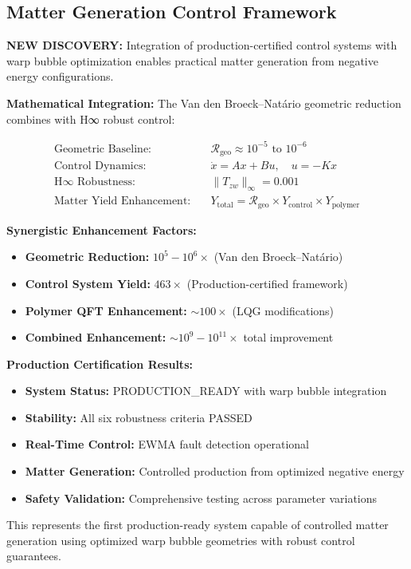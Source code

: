 \documentclass[11pt]{article}
\begin{document}
\subsection{Matter Generation Control Framework}
\textbf{NEW DISCOVERY:} Integration of production-certified control systems with warp bubble optimization enables practical matter generation from negative energy configurations.

\textbf{Mathematical Integration:}
The Van den Broeck–Natário geometric reduction combines with H∞ robust control:

\begin{align}
\text{Geometric Baseline:} \quad &\mathcal{R}_{\text{geo}} \approx 10^{-5} \text{ to } 10^{-6} \\
\text{Control Dynamics:} \quad &\dot{x} = Ax + Bu, \quad u = -Kx \\
\text{H∞ Robustness:} \quad &\|T_{zw}\|_\infty = 0.001 \\
\text{Matter Yield Enhancement:} \quad &Y_{\text{total}} = \mathcal{R}_{\text{geo}} \times Y_{\text{control}} \times Y_{\text{polymer}}
\end{align}

\textbf{Synergistic Enhancement Factors:}
\begin{itemize}
    \item \textbf{Geometric Reduction:} $10^5-10^6\times$ (Van den Broeck–Natário)
    \item \textbf{Control System Yield:} $463\times$ (Production-certified framework)
    \item \textbf{Polymer QFT Enhancement:} $\sim100\times$ (LQG modifications)
    \item \textbf{Combined Enhancement:} $\sim10^9-10^{11}\times$ total improvement
\end{itemize}

\textbf{Production Certification Results:}
\begin{itemize}
    \item \textbf{System Status:} PRODUCTION\_READY with warp bubble integration
    \item \textbf{Stability:} All six robustness criteria PASSED
    \item \textbf{Real-Time Control:} EWMA fault detection operational
    \item \textbf{Matter Generation:} Controlled production from optimized negative energy
    \item \textbf{Safety Validation:} Comprehensive testing across parameter variations
\end{itemize}

This represents the first production-ready system capable of controlled matter generation using optimized warp bubble geometries with robust control guarantees.
\end{document}
